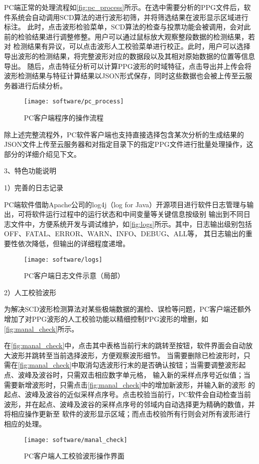 PC端正常的处理流程如\autoref{fig:pc_process}所示。在选中需要分析的PPG文件后，软件系统会自动调用SCD算法的进行波形初筛，并将筛选结果在波形显示区域进行标注。
此时，点击波形检验菜单，SCD算法的检查与投票功能会被调用，会对此前的检验结果进行调整修整。用户可以通过鼠标放大观察整段数据的检测结果，若对
检测结果有异议，可以点击波形人工校验菜单进行校正。此时，用户可以选择导出波形的检测结果，将完整波形对应的数据段以及其相对原始数据的位置等信息导出。
随后，点击特征分析可以计算PPG波形的时域特征，点击导出并上传会将波形检测结果与特征计算结果以JSON形式保存，同时这些数据也会被上传至云服务器进行后续分析。
\begin{figure}[htbp]
    \centering
    \texttt{[image: software/pc\_process]}
    \caption{\label{fig:pc_process}PC客户端程序的操作流程}
\end{figure}

除上述完整流程外，PC软件客户端也支持直接选择包含某次分析的生成结果的JSON文件上传至云服务器和对指定目录下的指定PPG文件进行批量处理操作，这部分的详细介绍见下文。

3、特色功能说明

1）完善的日志记录

PC端软件借助Apache公司的log4j（log for Java）开源项目进行软件日志管理与输出，可将软件运行过程中的运行状态和中间变量等关键信息按级别
输出到不同日志文件中，方便系统开发与调试维护，如\autoref{fig:logs}所示。其中，日志输出级别包括OFF、FATAL、ERROR、WARN、INFO、DEBUG、ALL等，
其日志输出的重要性依次降低，但输出的详细程度递增。
\begin{figure}[htbp]
    \centering
    \texttt{[image: software/logs]}
    \caption{\label{fig:logs}PC客户端日志文件示意（局部）}
\end{figure}

2）人工校验波形

为解决SCD波形检测算法对某些极端数据的漏检、误检等问题，PC客户端还额外增加了对PPG波形的人工校验功能以精细控制PPG波形的增删，如\autoref{fig:manal_check}所示。

在\autoref{fig:manal_check}中，点击其中表格当前行末的跳转至按钮，软件界面会自动放大波形并跳转至当前选择波形，方便观察波形细节。
当需要删除已检波形时，只需在\autoref{fig:manal_check}中取消勾选波形行末的是否确认按钮；当需要调整波形起点、波峰及波谷时，只需双击相应数字单元格，
输入新的采样点序号近似值；当需要新增波形时，只需点击\autoref{fig:manal_check}中的增加新波形，并输入新的波形
的起点、波峰及波谷的近似采样点序号。点击校验当前行，PC软件会自动检查当前波形，并在起点、波峰及波谷的采样点序号的邻域内自动选择更为精确的数值，并将相应操作更新至
软件的波形显示区域；而点击校验所有行则会对所有波形进行相应的处理。
\begin{figure}[htbp]
    \centering
    \texttt{[image: software/manal\_check]}
    \caption{\label{fig:manal_check}PC客户端人工校验波形操作界面}
\end{figure}

